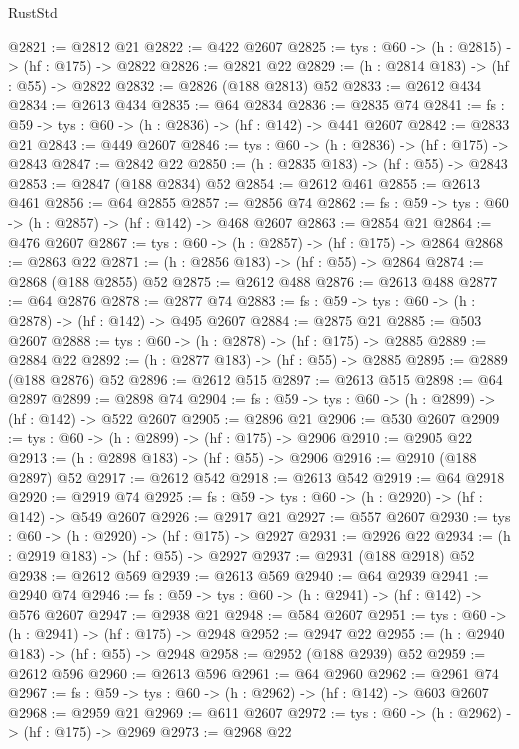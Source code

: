 \begin{lexlean}{RustStd}
\begin{coremodule}
@2821 := @2812 @21
@2822 := @422 @2607
@2825 := {tys : @60} -> (h : @2815) -> (hf : @175) -> @2822
@2826 := @2821 @22
@2829 := (h : @2814 @183) -> (hf : @55) -> @2822
@2832 := @2826 (@188 @2813) @52
@2833 := @2612 @434
@2834 := @2613 @434
@2835 := @64 @2834
@2836 := @2835 @74
@2841 := {fs : @59} -> {tys : @60} -> (h : @2836) -> (hf : @142) -> @441 @2607
@2842 := @2833 @21
@2843 := @449 @2607
@2846 := {tys : @60} -> (h : @2836) -> (hf : @175) -> @2843
@2847 := @2842 @22
@2850 := (h : @2835 @183) -> (hf : @55) -> @2843
@2853 := @2847 (@188 @2834) @52
@2854 := @2612 @461
@2855 := @2613 @461
@2856 := @64 @2855
@2857 := @2856 @74
@2862 := {fs : @59} -> {tys : @60} -> (h : @2857) -> (hf : @142) -> @468 @2607
@2863 := @2854 @21
@2864 := @476 @2607
@2867 := {tys : @60} -> (h : @2857) -> (hf : @175) -> @2864
@2868 := @2863 @22
@2871 := (h : @2856 @183) -> (hf : @55) -> @2864
@2874 := @2868 (@188 @2855) @52
@2875 := @2612 @488
@2876 := @2613 @488
@2877 := @64 @2876
@2878 := @2877 @74
@2883 := {fs : @59} -> {tys : @60} -> (h : @2878) -> (hf : @142) -> @495 @2607
@2884 := @2875 @21
@2885 := @503 @2607
@2888 := {tys : @60} -> (h : @2878) -> (hf : @175) -> @2885
@2889 := @2884 @22
@2892 := (h : @2877 @183) -> (hf : @55) -> @2885
@2895 := @2889 (@188 @2876) @52
@2896 := @2612 @515
@2897 := @2613 @515
@2898 := @64 @2897
@2899 := @2898 @74
@2904 := {fs : @59} -> {tys : @60} -> (h : @2899) -> (hf : @142) -> @522 @2607
@2905 := @2896 @21
@2906 := @530 @2607
@2909 := {tys : @60} -> (h : @2899) -> (hf : @175) -> @2906
@2910 := @2905 @22
@2913 := (h : @2898 @183) -> (hf : @55) -> @2906
@2916 := @2910 (@188 @2897) @52
@2917 := @2612 @542
@2918 := @2613 @542
@2919 := @64 @2918
@2920 := @2919 @74
@2925 := {fs : @59} -> {tys : @60} -> (h : @2920) -> (hf : @142) -> @549 @2607
@2926 := @2917 @21
@2927 := @557 @2607
@2930 := {tys : @60} -> (h : @2920) -> (hf : @175) -> @2927
@2931 := @2926 @22
@2934 := (h : @2919 @183) -> (hf : @55) -> @2927
@2937 := @2931 (@188 @2918) @52
@2938 := @2612 @569
@2939 := @2613 @569
@2940 := @64 @2939
@2941 := @2940 @74
@2946 := {fs : @59} -> {tys : @60} -> (h : @2941) -> (hf : @142) -> @576 @2607
@2947 := @2938 @21
@2948 := @584 @2607
@2951 := {tys : @60} -> (h : @2941) -> (hf : @175) -> @2948
@2952 := @2947 @22
@2955 := (h : @2940 @183) -> (hf : @55) -> @2948
@2958 := @2952 (@188 @2939) @52
@2959 := @2612 @596
@2960 := @2613 @596
@2961 := @64 @2960
@2962 := @2961 @74
@2967 := {fs : @59} -> {tys : @60} -> (h : @2962) -> (hf : @142) -> @603 @2607
@2968 := @2959 @21
@2969 := @611 @2607
@2972 := {tys : @60} -> (h : @2962) -> (hf : @175) -> @2969
@2973 := @2968 @22

\end{coremodule}
\end{lexlean}
